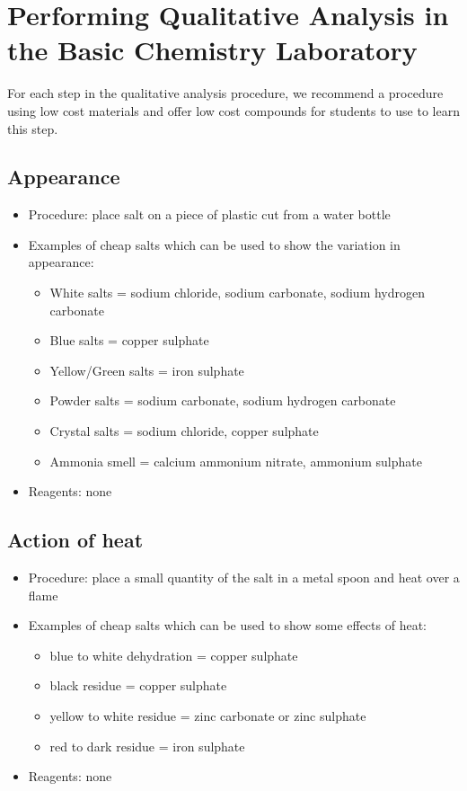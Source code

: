 \section{Performing Qualitative Analysis in the Basic Chemistry Laboratory}

For each step in the qualitative analysis procedure, 
we recommend a procedure using low cost materials 
and offer low cost compounds for students to use to learn this step.

\subsection{Appearance}
\begin{itemize}
\item{Procedure: place salt on a piece of plastic cut from a water bottle}
\item{Examples of cheap salts which can be used to show the variation in appearance:}
\begin{itemize}
\item{White salts = sodium chloride, 
sodium carbonate, 
sodium hydrogen carbonate}
\item{Blue salts = copper sulphate}
\item{Yellow/Green salts = iron sulphate}
\item{Powder salts = sodium carbonate, 
sodium hydrogen carbonate}
\item{Crystal salts = sodium chloride, 
copper sulphate}
\item{Ammonia smell = calcium ammonium nitrate, ammonium sulphate}
\end{itemize}
\item{Reagents: none}
\end{itemize}

\subsection{Action of heat}
\begin{itemize}
\item{Procedure: place a small quantity of the salt 
in a metal spoon and heat over a flame}
\item{Examples of cheap salts which can be used to show some effects of heat:} 
\begin{itemize}
\item{blue to white dehydration = copper sulphate}
\item{black residue = copper sulphate}
\item{yellow to white residue = zinc carbonate or zinc sulphate} 
\item{red to dark residue = iron sulphate}
\end{itemize}
\item{Reagents: none}
\end{itemize}

